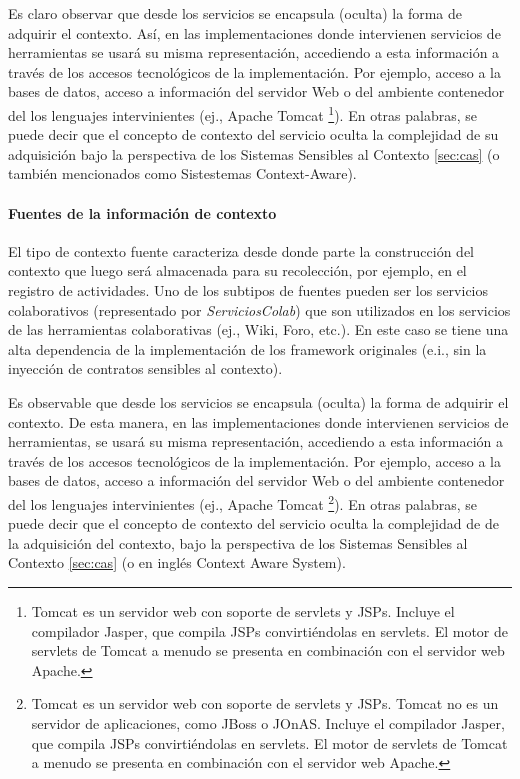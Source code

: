 Es claro observar que desde los servicios se encapsula (oculta) la forma de
adquirir el contexto. Así, en las implementaciones
donde intervienen servicios de herramientas se usará su misma
representación, accediendo a esta información a través de los accesos
tecnológicos de la implementación. Por ejemplo, acceso a la bases de datos,
acceso a información del servidor Web o del ambiente contenedor del los
lenguajes intervinientes (ej., Apache Tomcat \footnote{Tomcat es un servidor web
con soporte de servlets y JSPs. Incluye el compilador Jasper, que compila JSPs
convirtiéndolas en
servlets. El motor de servlets de Tomcat a menudo se presenta en combinación con
el servidor web Apache.}). En otras palabras, se puede decir que el concepto de
contexto del servicio oculta la complejidad de su adquisición
bajo la perspectiva de los Sistemas Sensibles al Contexto \ref{sec:cas} (o
también mencionados como Sistestemas Context-Aware).



\paragraph{Fuentes de la información de contexto}

El tipo de contexto fuente caracteriza desde donde parte la construcción del
contexto que luego será almacenada para su recolección, por ejemplo, en el
registro de actividades. Uno de los subtipos de fuentes pueden ser los
servicios colaborativos (representado por \textit{ServiciosColab}) que son
utilizados en los servicios de las herramientas colaborativas (ej., Wiki, Foro,
etc.).
En este caso se tiene una alta dependencia de la implementación de los
framework originales (e.i., sin la inyección de contratos sensibles al
contexto). 

Es observable que desde los servicios se encapsula (oculta) la forma de
adquirir el contexto. De esta manera, en las implementaciones
donde intervienen servicios de herramientas, se usará su misma
representación, accediendo a esta información a través de los accesos
tecnológicos de la implementación. Por ejemplo, acceso a la bases de datos,
acceso a información del servidor Web o del ambiente contenedor del los
lenguajes intervinientes (ej., Apache Tomcat \footnote{Tomcat es un servidor web
con soporte de servlets y JSPs. Tomcat no es un servidor de aplicaciones, como
JBoss o JOnAS. Incluye el compilador Jasper, que compila JSPs convirtiéndolas en
servlets. El motor de servlets de Tomcat a menudo se presenta en combinación con
el servidor web Apache.}). En otras palabras, se puede decir que el concepto de
contexto del servicio oculta la complejidad de de la adquisición del contexto,
bajo la perspectiva de los Sistemas Sensibles al Contexto \ref{sec:cas} (o en
inglés Context Aware System).



